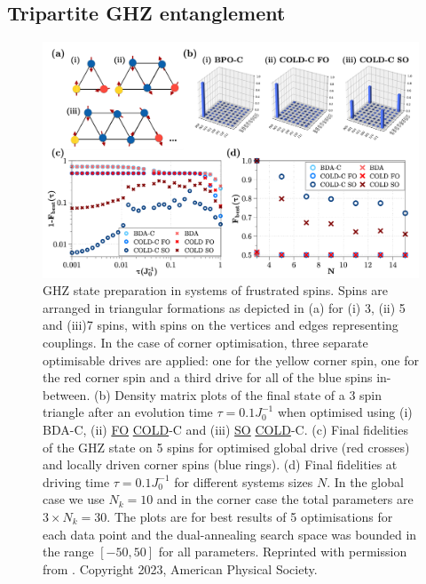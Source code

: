 \documentclass[a4paper,oneside,11pt]{book}
\newcommand{\acrref}[1]{\hyperref[acr:#1]{#1}}
\begin{document}
\subsection{Tripartite GHZ entanglement}\label{sec:6.4.1_t3}

\begin{figure}[t!]
    \centering
    \includegraphics[width=\linewidth]{images/frustrated.png} \caption[Preparation of GHZ states in a system of frustrated spins.]{GHZ state preparation in systems of frustrated spins. Spins are arranged in triangular formations as depicted in (a) for (i) 3, (ii) 5 and (iii)7 spins, with spins on the vertices and edges representing couplings.  In the case of corner optimisation, three separate optimisable drives are applied: one for the yellow corner spin, one for the red corner spin and a third drive for all of the blue spins in-between. (b) Density matrix plots of the final state of a 3 spin triangle after an evolution time $\tau = 0.1J_0^{-1}$ when optimised using (i) BDA-C, (ii) \acrref{FO} \acrref{COLD}-C and (iii) \acrref{SO} \acrref{COLD}-C. (c) Final fidelities of the GHZ state on 5 spins for optimised global drive (red crosses) and locally driven corner spins (blue rings). (d) Final fidelities at driving time $\tau = 0.1J_0^{-1}$ for different systems sizes $N$. In the global case we use $N_k = 10$ and in the corner case the total parameters are $3 \times N_k = 30$. The plots are for best results of 5 optimisations for each data point and the dual-annealing search space was bounded in the range $[-50, 50]$ for all parameters. Reprinted with permission from \cite{cepaite_counterdiabatic_2023}. Copyright 2023, American Physical Society.} \label{fig:ghz_mainfig}
\end{figure}
\end{document}

